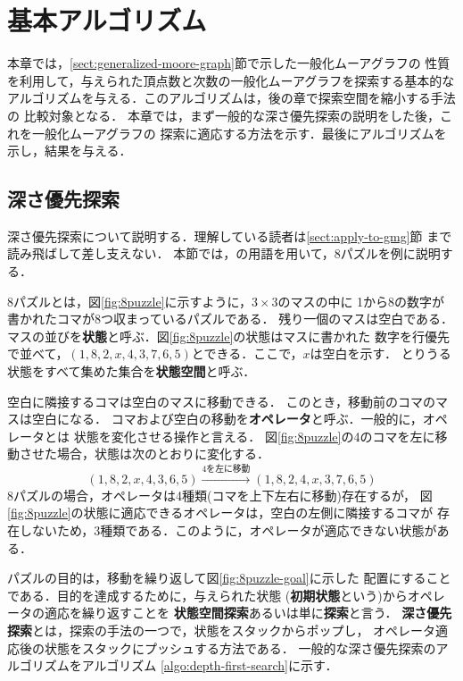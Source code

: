 
\chapter{基本アルゴリズム}
\label{chap:basic-algorithm}
本章では，\ref{sect:generalized-moore-graph}節で示した一般化ムーアグラフの
性質を利用して，与えられた頂点数と次数の一般化ムーアグラフを探索する基本的な
アルゴリズムを与える．このアルゴリズムは，後の章で探索空間を縮小する手法の
比較対象となる．
本章では，まず一般的な深さ優先探索の説明をした後，これを一般化ムーアグラフの
探索に適応する方法を示す．最後にアルゴリズムを示し，結果を与える．

\section{深さ優先探索}
\label{sect:depth-first-search}
深さ優先探索について説明する．理解している読者は\ref{sect:apply-to-gmg}節
まで読み飛ばして差し支えない．
本節では，\cite{Makoto1988}の用語を用いて，8パズルを例に説明する．

8パズルとは，図\ref{fig:8puzzle}に示すように，$3\times3$のマスの中に
1から8の数字が書かれたコマが8つ収まっているパズルである．
残り一個のマスは空白である．
マスの並びを\textbf{状態}と呼ぶ．図\ref{fig:8puzzle}の状態はマスに書かれた
数字を行優先で並べて，$(1,8,2,x,4,3,7,6,5)$とできる．ここで，$x$は空白を示す．
とりうる状態をすべて集めた集合を\textbf{状態空間}と呼ぶ．

空白に隣接するコマは空白のマスに移動できる．
このとき，移動前のコマのマスは空白になる．
コマおよび空白の移動を\textbf{オペレータ}と呼ぶ．一般的に，オペレータとは
状態を変化させる操作と言える．
図\ref{fig:8puzzle}の4のコマを左に移動させた場合，状態は次のとおりに変化する．
\[ (1,8,2,x,4,3,6,5) \xrightarrow{\text{4を左に移動}} (1,8,2,4,x,3,7,6,5) \]
8パズルの場合，オペレータは4種類(コマを上下左右に移動)存在するが，
図\ref{fig:8puzzle}の状態に適応できるオペレータは，空白の左側に隣接するコマが
存在しないため，3種類である．このように，オペレータが適応できない状態がある．

パズルの目的は，移動を繰り返して図\ref{fig:8puzzle-goal}に示した
配置にすることである．目的を達成するために，与えられた状態
(\textbf{初期状態}という)からオペレータの適応を繰り返すことを
\textbf{状態空間探索}あるいは単に\textbf{探索}と言う．
\textbf{深さ優先探索}とは，探索の手法の一つで，状態をスタックからポップし，
オペレータ適応後の状態をスタックにプッシュする方法である．
一般的な深さ優先探索のアルゴリズムをアルゴリズム
\ref{algo:depth-first-search}に示す．

